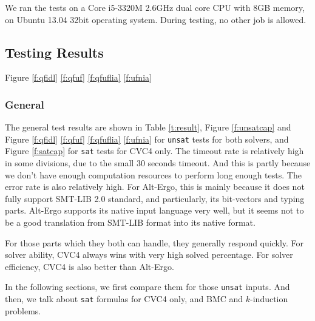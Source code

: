 \documentclass[10pt,letter]{article}
\theoremstyle{definition}
\begin{document}
We ran the tests on a Core i5-3320M 2.6GHz dual core CPU with 8GB memory, on Ubuntu 13.04 32bit operating system. During testing, no other job is allowed.



\subsection{Testing Results}
Figure \ref{f:qfidl} \ref{f:qfuf} \ref{f:qfuflia} \ref{f:ufnia}
\subsubsection{General}

The general test results are shown in Table \ref{t:result}, Figure \ref{f:unsatcap} and Figure \ref{f:qfidl} \ref{f:qfuf} \ref{f:qfuflia} \ref{f:ufnia} for {\tt unsat} tests for both solvers, and Figure \ref{f:satcap} for {\tt sat} tests for CVC4 only. The timeout rate is relatively high in some divisions, due to the small 30 seconds timeout. And this is partly because we don't have enough computation resources to perform long enough tests. The error rate is also relatively high. For Alt-Ergo, this is mainly because it does not fully support SMT-LIB 2.0 standard, and particularly, its bit-vectors and typing parts. Alt-Ergo supports its native input language very well, but it seems not to be a good translation from SMT-LIB format into its native format. 

For those parts which they both can handle, they generally respond quickly. For solver ability, CVC4 always wins with very high solved percentage. For solver efficiency, CVC4 is also better than Alt-Ergo.

In the following sections, we first compare them for those {\tt unsat} inputs. And then, we talk about {\tt sat} formulas for CVC4 only, and BMC and $k$-induction problems.
\end{document}
